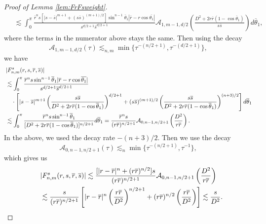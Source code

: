 \documentclass[11pt]{amsart}
\theoremstyle{definition}
\theoremstyle{remark}
\numberwithin{equation}{section}
\numberwithin{equation}{section}
\newcommand{\br}[1]{\overline{#1}}
\newcommand{\0}{\emptyset}
\newcommand{\tht}{\theta}
\newcommand{\calA}{\mathcal A}
\begin{document}
\begin{proof}[Proof of Lemma \ref{lem:FrFsweight}]
\begin{equation}
\begin{aligned}
				\;&\lesssim %
				\int_{0}^{\pi}\frac{\br{r}^{n}s[|s-\br{s}|^{m+1}+(s\br{s})^{(m+1)/2}]\sin^{n-1}\br{\tht}_{1}|\br{r}-r\cos\br{\tht_{1}}|}{s^{d/2+1}\br{s}^{d/2+1}}\calA_{1,m-1,d/2}\left(\frac{D^{2}+2r\br{r}(1-\cos\br{\tht}_{1})}{s\br{s}}\right)d\br{\tht}_{1},
			\end{aligned}
		\end{equation}
		where the term$ s $ in the numerator above stays the same. Then using the decay
		\begin{equation}
			\calA_{1,m-1,d/2}(\tau)\lesssim_{n,m} \min\{ \tau^{-(n/2+1)},\tau^{-(d/2+1)}\},
		\end{equation}
		we have
		\begin{equation}
			\begin{aligned}
				&|F_{n,m}^{s}(r,s,\br{r},\br{s})|\\
				\;&\lesssim %
				\int_{0}^{\pi}\frac{\br{r}^{n}s\sin^{n-1}\br{\tht}_{1}|\br{r}-r\cos\br{\tht_{1}}|}{s^{d/2+1}\br{s}^{d/2+1}}\\
				&\quad\cdot\left[|s-\br{s}|^{m+1}\left( \frac{s\br{s}}{D^{2}+2r\br{r}(1-\cos\br{\tht}_{1})}\right)^{d/2+1}+(s\br{s})^{(m+1)/2} \left( \frac{s\br{s}}{D^{2}+2r\br{r}(1-\cos\br{\tht}_{1})}\right)^{(n+3)/2}\right]d\br{\tht}_{1}\\
				\;&\lesssim \int_{0}^{\pi}\frac{%
					\br{r}^{n}s\sin^{n-1}\br{\tht}_{1}}{[D^{2}+2r\br{r}(1-\cos\br{\tht}_{1})]^{n/2+1}}d\br{\tht}_{1}=\frac{\br{r}^{n}s}{(r\br{r})^{n/2+1}}\calA_{0,n-1,n/2+1}\left(\frac{D^{2}}{r\br{r}}\right).
			\end{aligned}
		\end{equation}
		In the above, we used the decay rate $-(n+3)/2$. Then we use the decay
		\begin{equation}
			\calA_{0,n-1,n/2+1}(\tau)\lesssim_{n} \min\{ \tau^{-(n/2+1)},\tau^{-1}\},
		\end{equation}
		which gives us
		\begin{equation}
			\begin{aligned}
				&|F_{n,m}^{s}(r,s,\br{r},\br{s})|\lesssim %
				\frac{[|r-\br{r}|^{n}+(r\br{r})^{n/2}]s}{(r\br{r})^{n/2+1}}\calA_{0,n-1,n/2+1}\left(\frac{D^{2}}{r\br{r}}\right)%
				\\
				\quad&\lesssim \frac{%
					s}{(r\br{r})^{n/2+1}}\left[|r-\br{r}|^{n}\left(\frac{r\br{r}}{D^{2}}\right)^{n/2+1}+(r\br{r})^{n/2}\left(\frac{r\br{r}}{D^{2}}\right)\right]\lesssim \frac{s%
				}{D^{2}}.
			\end{aligned}
		\end{equation}
	\end{proof}
\end{document}
